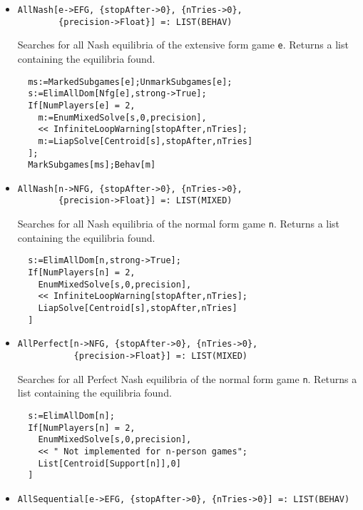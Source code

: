 \begin{itemize}
\item{}
\protect \large \begin{verbatim}
AllNash[e->EFG, {stopAfter->0}, {nTries->0}, 
        {precision->Float}] =: LIST(BEHAV) 
\end{verbatim}\normalsize

\bd 
Searches for all Nash equilibria of the extensive form game
\verb+e+.  Returns a list containing the equilibria found.

\begin{verbatim}
  ms:=MarkedSubgames[e];UnmarkSubgames[e];
  s:=ElimAllDom[Nfg[e],strong->True];
  If[NumPlayers[e] = 2, 
    m:=EnumMixedSolve[s,0,precision],
    << InfiniteLoopWarning[stopAfter,nTries];
    m:=LiapSolve[Centroid[s],stopAfter,nTries]
  ];
  MarkSubgames[ms];Behav[m]
\end{verbatim} 
\ed

\item{}
\protect \large \begin{verbatim}
AllNash[n->NFG, {stopAfter->0}, {nTries->0}, 
        {precision->Float}] =: LIST(MIXED) 
\end{verbatim}\normalsize

\bd 
Searches for all Nash equilibria of the normal form game
\verb+n+.  Returns a list containing the equilibria found.

\begin{verbatim}
  s:=ElimAllDom[n,strong->True];
  If[NumPlayers[n] = 2, 
    EnumMixedSolve[s,0,precision],
    << InfiniteLoopWarning[stopAfter,nTries];
    LiapSolve[Centroid[s],stopAfter,nTries]
  ]
\end{verbatim} 
\ed

\item{}
\protect \large \begin{verbatim}
AllPerfect[n->NFG, {stopAfter->0}, {nTries->0}, 
           {precision->Float}] =: LIST(MIXED) 
\end{verbatim}\normalsize

\bd 
Searches for all Perfect Nash equilibria of the normal form game
\verb+n+.  Returns a list containing the equilibria found.

\begin{verbatim}
  s:=ElimAllDom[n];
  If[NumPlayers[n] = 2, 
    EnumMixedSolve[s,0,precision],
    << " Not implemented for n-person games";
    List[Centroid[Support[n]],0]
  ]
\end{verbatim} 
\ed

\item{}
\protect \large \begin{verbatim}
AllSequential[e->EFG, {stopAfter->0}, {nTries->0}] =: LIST(BEHAV) 
\end{verbatim}\normalsize


\end{itemize}
